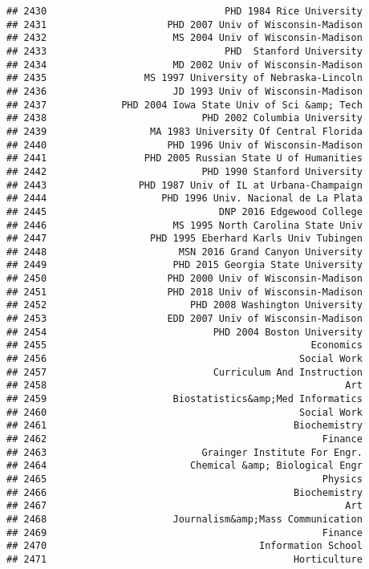 \documentclass[
]{article}
\begin{document}
\begin{verbatim}
## 2430                               PHD 1984 Rice University
## 2431                     PHD 2007 Univ of Wisconsin-Madison
## 2432                      MS 2004 Univ of Wisconsin-Madison
## 2433                               PHD  Stanford University
## 2434                      MD 2002 Univ of Wisconsin-Madison
## 2435                 MS 1997 University of Nebraska-Lincoln
## 2436                      JD 1993 Univ of Wisconsin-Madison
## 2437             PHD 2004 Iowa State Univ of Sci &amp; Tech
## 2438                           PHD 2002 Columbia University
## 2439                  MA 1983 University Of Central Florida
## 2440                     PHD 1996 Univ of Wisconsin-Madison
## 2441                 PHD 2005 Russian State U of Humanities
## 2442                           PHD 1990 Stanford University
## 2443                PHD 1987 Univ of IL at Urbana-Champaign
## 2444                    PHD 1996 Univ. Nacional de La Plata
## 2445                              DNP 2016 Edgewood College
## 2446                      MS 1995 North Carolina State Univ
## 2447                  PHD 1995 Eberhard Karls Univ Tubingen
## 2448                       MSN 2016 Grand Canyon University
## 2449                      PHD 2015 Georgia State University
## 2450                     PHD 2000 Univ of Wisconsin-Madison
## 2451                     PHD 2018 Univ of Wisconsin-Madison
## 2452                         PHD 2008 Washington University
## 2453                     EDD 2007 Univ of Wisconsin-Madison
## 2454                             PHD 2004 Boston University
## 2455                                              Economics
## 2456                                            Social Work
## 2457                             Curriculum And Instruction
## 2458                                                    Art
## 2459                      Biostatistics&amp;Med Informatics
## 2460                                            Social Work
## 2461                                           Biochemistry
## 2462                                                Finance
## 2463                           Grainger Institute For Engr.
## 2464                         Chemical &amp; Biological Engr
## 2465                                                Physics
## 2466                                           Biochemistry
## 2467                                                    Art
## 2468                      Journalism&amp;Mass Communication
## 2469                                                Finance
## 2470                                     Information School
## 2471                                           Horticulture

\end{verbatim}
\end{document}
